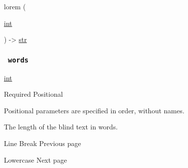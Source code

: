 { lorem } (

{ \href{/docs/reference/foundations/int/}{int} }

) -\textgreater{} \href{/docs/reference/foundations/str/}{str}

\subsubsection{\texorpdfstring{\texttt{\ words\ }}{ words }}\label{parameters-words}

\href{/docs/reference/foundations/int/}{int}

{Required} {{ Positional }}

\label{parameters-words-positional-tooltip}
Positional parameters are specified in order, without names.

The length of the blind text in words.

\href{/docs/reference/text/linebreak/}{\pandocbounded{}}

{ Line Break } { Previous page }

\href{/docs/reference/text/lower/}{\pandocbounded{}}

{ Lowercase } { Next page }
